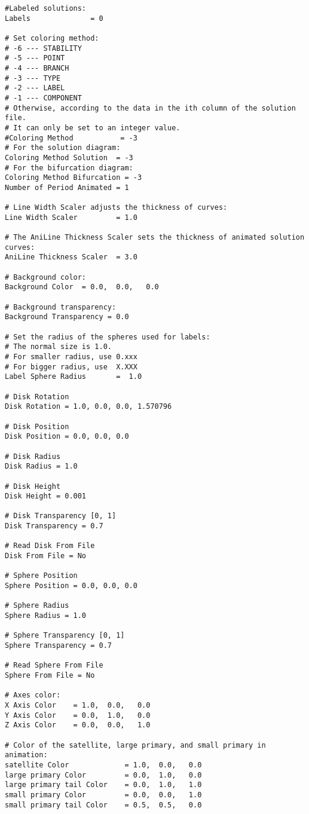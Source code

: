 {\begin{verbatim}
#Labeled solutions:
Labels              = 0

# Set coloring method:
# -6 --- STABILITY
# -5 --- POINT
# -4 --- BRANCH
# -3 --- TYPE 
# -2 --- LABEL 
# -1 --- COMPONENT 
# Otherwise, according to the data in the ith column of the solution file.
# It can only be set to an integer value.
#Coloring Method           = -3
# For the solution diagram:
Coloring Method Solution  = -3
# For the bifurcation diagram:
Coloring Method Bifurcation = -3
Number of Period Animated = 1

# Line Width Scaler adjusts the thickness of curves:
Line Width Scaler         = 1.0

# The AniLine Thickness Scaler sets the thickness of animated solution curves:
AniLine Thickness Scaler  = 3.0

# Background color:
Background Color  = 0.0,  0.0,   0.0

# Background transparency:
Background Transparency = 0.0 

# Set the radius of the spheres used for labels:
# The normal size is 1.0.
# For smaller radius, use 0.xxx
# For bigger radius, use  X.XXX
Label Sphere Radius       =  1.0

# Disk Rotation
Disk Rotation = 1.0, 0.0, 0.0, 1.570796

# Disk Position
Disk Position = 0.0, 0.0, 0.0

# Disk Radius
Disk Radius = 1.0

# Disk Height
Disk Height = 0.001

# Disk Transparency [0, 1]
Disk Transparency = 0.7 
 
# Read Disk From File
Disk From File = No 
 
# Sphere Position
Sphere Position = 0.0, 0.0, 0.0

# Sphere Radius
Sphere Radius = 1.0

# Sphere Transparency [0, 1]
Sphere Transparency = 0.7

# Read Sphere From File
Sphere From File = No

# Axes color:
X Axis Color    = 1.0,  0.0,   0.0
Y Axis Color    = 0.0,  1.0,   0.0
Z Axis Color    = 0.0,  0.0,   1.0

# Color of the satellite, large primary, and small primary in animation:
satellite Color             = 1.0,  0.0,   0.0
large primary Color         = 0.0,  1.0,   0.0
large primary tail Color    = 0.0,  1.0,   1.0
small primary Color         = 0.0,  0.0,   1.0
small primary tail Color    = 0.5,  0.5,   0.0


\end{verbatim}}
